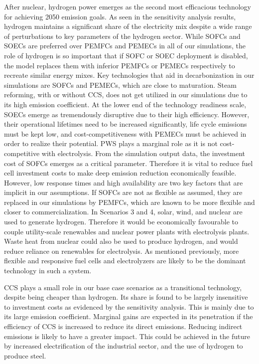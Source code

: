 After nuclear, hydrogen power emerges as the second most efficacious technology for achieving 2050 emission goals. As seen in the sensitivity analysis results, hydrogen maintains a significant share of the electricity mix despite a wide range of perturbations to key parameters of the hydrogen sector. While \gls{SOFC}s and \gls{SOEC}s are preferred over \gls{PEMFC}s and \gls{PEMEC}s in all of our simulations, the role of hydrogen is so important that if \gls{SOFC} or \gls{SOEC} deployment is disabled, the model replaces them with inferior \gls{PEMFC}s or \gls{PEMEC}s respectively to recreate similar energy mixes. Key technologies that aid in decarbonization in our simulations are \gls{SOFC}s and \gls{PEMEC}s, which are close to maturation. Steam reforming, with or without CCS, does not get utilized in our simulations due to its high emission coefficient. At the lower end of the technology readiness scale, \gls{SOEC}s emerge as tremendously disruptive due to their high efficiency. However, their operational lifetimes need to be increased significantly, life cycle emissions must be kept low, and cost-competitiveness with \gls{PEMEC}s must be achieved in order to realize their potential. \gls{PWS} plays a marginal role as it is not cost-competitive with electrolysis. From the simulation output data, the investment cost of \gls{SOFC}s emerges as a critical parameter. Therefore it is vital to reduce fuel cell investment costs to make deep emission reduction economically feasible. However, low response times and high availability are two key factors that are implicit in our assumptions. If \gls{SOFC}s are not as flexible as assumed, they are replaced in our simulations by \gls{PEMFC}s, which are known to be more flexible and closer to commercialization. In Scenarios 3 and 4, solar, wind, and nuclear are used to generate hydrogen. Therefore it would be economically favourable to couple utility-scale renewables and nuclear power plants with electrolysis plants. Waste heat from nuclear could also be used to produce hydrogen, and would reduce reliance on renewables for electrolysis. As mentioned previously, more flexible and responsive fuel cells and electrolyzers are likely to be the dominant technology in such a system.

CCS plays a small role in our base case scenarios as a transitional technology, despite being cheaper than hydrogen. Its share is found to be largely insensitive to  investment costs as evidenced by the sensitivity analysis. This is mainly due to its large emission coefficient. Marginal gains are expected in its penetration if the efficiency of CCS is increased to reduce its direct emissions. Reducing indirect emissions is likely to have a greater impact. This could be achieved in the future by increased electrification of the industrial sector, and the use of hydrogen to produce steel.
